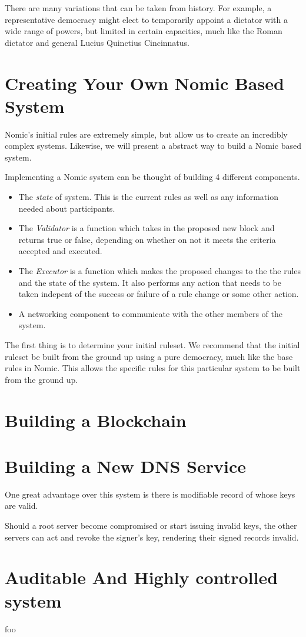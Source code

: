 \documentclass[11pt,letterpaper]{article}
\begin{document}
	There are many variations that can be taken from history.  
	For example, a representative democracy might elect to temporarily appoint a dictator with a wide range of powers, but limited in certain capacities, much like the Roman dictator and general Lucius Quinctius Cincinnatus.
	
	
	\section{Creating Your Own Nomic Based System}
	
	
	Nomic's initial rules are extremely simple, but allow us to create an incredibly complex systems.
	Likewise, we will present a abstract way to build a Nomic based system.
	
	Implementing a Nomic system can be thought of building 4 different components.
	\begin{itemize}
		\item The \textit{state} of system.  This is the current rules as well as any information needed about participants.
		\item The \textit{Validator}  is  a function which takes in the proposed new block and  returns true or false, depending on whether on not it meets the criteria accepted and executed.
		\item The \textit{Executor} is a function which makes the proposed changes to the the rules and the state of the system.  It also performs any action that needs to be taken indepent of the success or failure of a rule change or some other action.
		\item A networking component to communicate with the other members of the system.
	\end{itemize}
	
	The first thing is to determine your initial ruleset.
	We recommend that the initial ruleset be built from the ground up using a pure democracy, much like the base rules in Nomic.
	This allows the specific rules for this particular system to be built from the ground up.
	
	
	
	\section{Building a Blockchain}
	
	\section{Building a New DNS Service}
	
	One great advantage over this system is there is modifiable record of whose keys are valid.
	
	Should a root server become compromised or start issuing invalid keys, the other servers can act and revoke the signer's key, rendering their signed records invalid.
	
	\section{Auditable And Highly controlled system}
	
	
	
	
	foo \cite{camilleri2010playing}
	 \cite{tezos}
	
	
\end{document}
